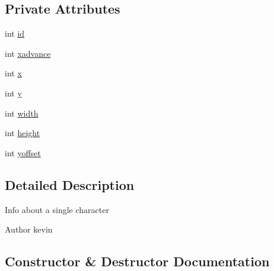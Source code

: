 \subsection*{Private Attributes}
\begin{DoxyCompactItemize}
\item 
int \mbox{\hyperlink{classorg_1_1newdawn_1_1slick_1_1tools_1_1hiero_1_1_data_set_1_1_char_data_a32705dfd59a917f2f9751e3354432c27}{id}}
\item 
int \mbox{\hyperlink{classorg_1_1newdawn_1_1slick_1_1tools_1_1hiero_1_1_data_set_1_1_char_data_aca19a5c45977a31b653943cd478e76cd}{xadvance}}
\item 
int \mbox{\hyperlink{classorg_1_1newdawn_1_1slick_1_1tools_1_1hiero_1_1_data_set_1_1_char_data_a78da82c8566e1eefdc8a7c93526d3a33}{x}}
\item 
int \mbox{\hyperlink{classorg_1_1newdawn_1_1slick_1_1tools_1_1hiero_1_1_data_set_1_1_char_data_a699420a1ac403133684164c370077f7e}{y}}
\item 
int \mbox{\hyperlink{classorg_1_1newdawn_1_1slick_1_1tools_1_1hiero_1_1_data_set_1_1_char_data_a8f410ca610493f3f3a5e7a2c7a546739}{width}}
\item 
int \mbox{\hyperlink{classorg_1_1newdawn_1_1slick_1_1tools_1_1hiero_1_1_data_set_1_1_char_data_ad9c673d8f3b449d6a57ea4af78846d62}{height}}
\item 
int \mbox{\hyperlink{classorg_1_1newdawn_1_1slick_1_1tools_1_1hiero_1_1_data_set_1_1_char_data_a007113e4ab007cbfe00de48954851d25}{yoffset}}
\end{DoxyCompactItemize}


\subsection{Detailed Description}
Info about a single character

\begin{DoxyAuthor}{Author}
kevin 
\end{DoxyAuthor}


\subsection{Constructor \& Destructor Documentation}
\mbox{\label{classorg_1_1newdawn_1_1slick_1_1tools_1_1hiero_1_1_data_set_1_1_char_data_a4e2f42be6696d0d2a7be8c4f8fd9c43b}} 
